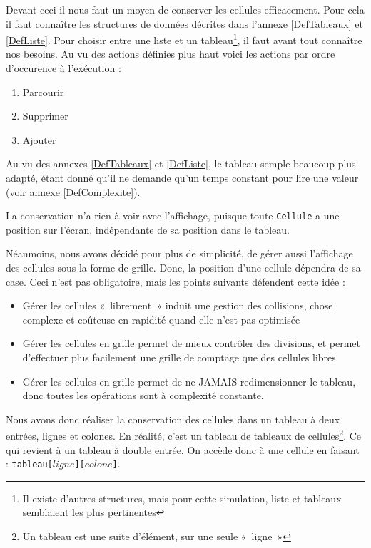 Devant ceci il nous faut un moyen de conserver les cellules efficacement.
Pour cela il faut connaître les structures de données décrites dans l'annexe \ref{DefTableaux} et \ref{DefListe}. Pour choisir entre une liste et un tableau\footnote{Il existe d'autres structures, mais pour cette simulation, liste et tableaux semblaient les plus pertinentes}, il faut avant tout connaître nos besoins. Au vu des actions définies plus haut voici les actions par ordre d'occurence à l'exécution : 
\begin{enumerate}
	\item Parcourir 
	\item Supprimer
	\item Ajouter
\end{enumerate}

Au vu des annexes \ref{DefTableaux} et \ref{DefListe}, le tableau semple beaucoup plus adapté, étant donné qu'il ne demande qu'un temps constant pour lire une valeur (voir annexe \ref{DefComplexite}).

La conservation n'a rien à voir avec l'affichage, puisque toute \texttt{Cellule} a une position sur l'écran, indépendante de sa position dans le tableau.

Néanmoins, nous avons décidé pour plus de simplicité, de gérer aussi l'affichage des cellules sous la forme de grille. Donc, la position d'une cellule dépendra de sa case. Ceci n'est pas obligatoire, mais les points suivants défendent cette idée : 
\begin{itemize}
	\item Gérer les cellules «~librement~» induit une gestion des collisions, chose complexe et coûteuse en rapidité quand elle n'est pas optimisée
	\item Gérer les cellules en grille permet de mieux contrôler des divisions, et permet d'effectuer plus facilement une grille de comptage que des cellules libres 
	\item Gérer les cellules en grille permet de ne JAMAIS redimensionner le tableau, donc 
	toutes les opérations sont à complexité constante.
\end{itemize}

Nous avons donc réaliser la conservation des cellules dans un tableau à deux entrées, lignes et colones. En réalité, c'est un tableau de tableaux de cellules\footnote{Un tableau est une suite d'élément, sur une seule «~ligne~»}. Ce qui revient à un tableau à double entrée. On accède donc à une cellule en faisant : \texttt{tableau[$ligne$][$colone$]}.

